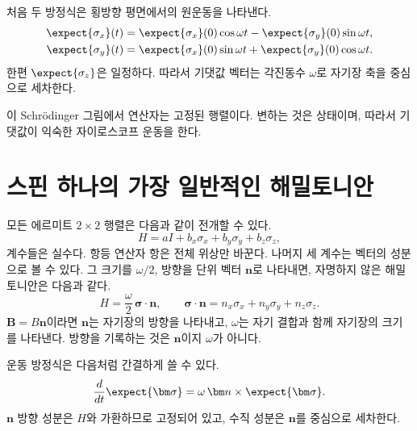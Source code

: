 처음 두 방정식은 횡방향 평면에서의 원운동을 나타낸다.
\begin{align}
\expect{\sigma_x}(t)
&=\expect{\sigma_x}(0)\cos\omega t
-\expect{\sigma_y}(0)\sin\omega t,\\
\expect{\sigma_y}(t)
&=\expect{\sigma_x}(0)\sin\omega t
+\expect{\sigma_y}(0)\cos\omega t.
\end{align}
한편 \(\expect{\sigma_z}\)은 일정하다. 따라서 기댓값 벡터는 각진동수 \(\omega\)로 자기장 축을 중심으로 세차한다.

이 Schr\"odinger 그림에서 연산자는 고정된 행렬이다. 변하는 것은 상태이며, 따라서 기댓값이 익숙한 자이로스코프 운동을 한다.

\begin{classroomqa}\end{classroomqa}

\section{스핀 하나의 가장 일반적인 해밀토니안}

모든 에르미트 \(2\times2\) 행렬은 다음과 같이 전개할 수 있다.
\begin{equation}
H=aI+b_x\sigma_x+b_y\sigma_y+b_z\sigma_z,
\end{equation}
계수들은 실수다. 항등 연산자 항은 전체 위상만 바꾼다. 나머지 세 계수는 벡터의 성분으로 볼 수 있다. 그 크기를 \(\omega/2\), 방향을 단위 벡터 \(\bm n\)로 나타내면, 자명하지 않은 해밀토니안은 다음과 같다.
\begin{equation}
H=\frac{\omega}{2}\,\bm\sigma\cdot\bm n,
\qquad
\bm\sigma\cdot\bm n
=n_x\sigma_x+n_y\sigma_y+n_z\sigma_z.
\label{eq:l5-general-spin-h}
\end{equation}
\(\bm B=B\bm n\)이라면 \(\bm n\)는 자기장의 방향을 나타내고, \(\omega\)는 자기 결합과 함께 자기장의 크기를 나타낸다. 방향을 기록하는 것은 \(\bm n\)이지 \(\omega\)가 아니다.

운동 방정식은 다음처럼 간결하게 쓸 수 있다.
\begin{equation}
\frac{d}{dt}\expect{\bm\sigma}
=\omega\,\bm n\times\expect{\bm\sigma}.
\end{equation}
\(\bm n\) 방향 성분은 \(H\)와 가환하므로 고정되어 있고, 수직 성분은 \(\bm n\)를 중심으로 세차한다.

